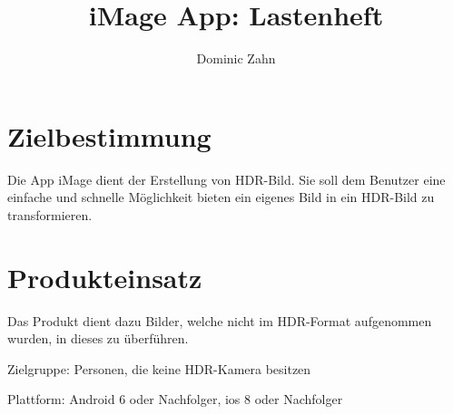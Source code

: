 \documentclass[parskip=full]{scrartcl}
\title{iMage App: Lastenheft}
\author{Dominic Zahn}
\begin{document}
\maketitle

\section{Zielbestimmung}

Die \gls{App} iMage dient der Erstellung von \gls{HDR-Bild}. Sie soll dem Benutzer eine einfache und
schnelle Möglichkeit bieten ein eigenes Bild in ein \gls{HDR-Bild} zu transformieren.

\section{Produkteinsatz}

Das Produkt dient dazu Bilder, welche nicht im HDR-Format aufgenommen wurden, in dieses zu überführen.

Zielgruppe: Personen, die keine HDR-Kamera besitzen

Plattform: Android 6 oder Nachfolger, ios 8 oder Nachfolger



\printnoidxglossaries
\end{document}
